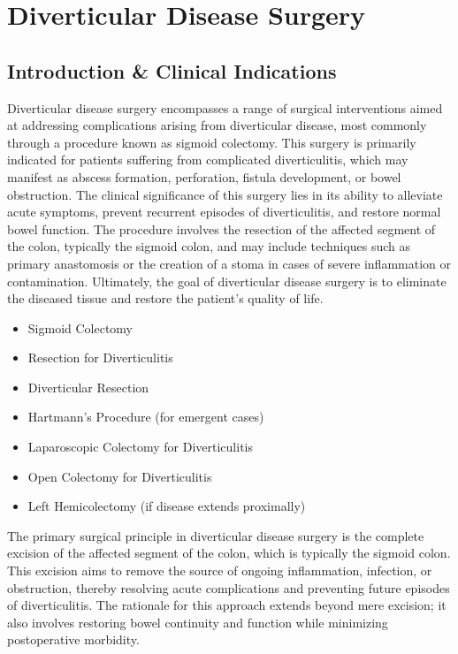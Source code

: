 \chapter{Diverticular Disease Surgery}

\section*{Introduction \& Clinical Indications}
Diverticular disease surgery encompasses a range of surgical interventions aimed at addressing complications arising from diverticular disease, most commonly through a procedure known as sigmoid colectomy. This surgery is primarily indicated for patients suffering from complicated diverticulitis, which may manifest as abscess formation, perforation, fistula development, or bowel obstruction. The clinical significance of this surgery lies in its ability to alleviate acute symptoms, prevent recurrent episodes of diverticulitis, and restore normal bowel function. The procedure involves the resection of the affected segment of the colon, typically the sigmoid colon, and may include techniques such as primary anastomosis or the creation of a stoma in cases of severe inflammation or contamination. Ultimately, the goal of diverticular disease surgery is to eliminate the diseased tissue and restore the patient's quality of life.

\begin{itemize}
  \item Sigmoid Colectomy
  \item Resection for Diverticulitis
  \item Diverticular Resection
  \item Hartmann's Procedure (for emergent cases)
  \item Laparoscopic Colectomy for Diverticulitis
  \item Open Colectomy for Diverticulitis
  \item Left Hemicolectomy (if disease extends proximally)
\end{itemize}

The primary surgical principle in diverticular disease surgery is the complete excision of the affected segment of the colon, which is typically the sigmoid colon. This excision aims to remove the source of ongoing inflammation, infection, or obstruction, thereby resolving acute complications and preventing future episodes of diverticulitis. The rationale for this approach extends beyond mere excision; it also involves restoring bowel continuity and function while minimizing postoperative morbidity.

